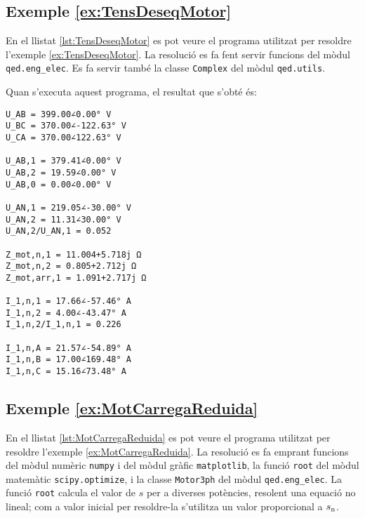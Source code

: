 \hypertarget{exemple:TensDeseqMotor}{\subsection{Exemple \ref*{ex:TensDeseqMotor} \TensDeseqMotor}}
En el llistat \vref{lst:TensDeseqMotor} es pot veure el programa utilitzat per resoldre l'exemple \vref{ex:TensDeseqMotor}. La resolució es fa fent servir funcions del mòdul \texttt{qed.eng\_elec}. Es fa servir també la classe \texttt{Complex} del mòdul \texttt{qed.utils}.


Quan s'executa aquest programa, el resultat que s'obté és:
\lstset{
	language=,
	numbers=none,
	frame=none
}
\begin{lstlisting}
U_AB = 399.00∠0.00° V
U_BC = 370.00∠-122.63° V
U_CA = 370.00∠122.63° V

U_AB,1 = 379.41∠0.00° V
U_AB,2 = 19.59∠0.00° V
U_AB,0 = 0.00∠0.00° V

U_AN,1 = 219.05∠-30.00° V
U_AN,2 = 11.31∠30.00° V
U_AN,2/U_AN,1 = 0.052

Z_mot,n,1 = 11.004+5.718j Ω
Z_mot,n,2 = 0.805+2.712j Ω
Z_mot,arr,1 = 1.091+2.717j Ω

I_1,n,1 = 17.66∠-57.46° A
I_1,n,2 = 4.00∠-43.47° A
I_1,n,2/I_1,n,1 = 0.226

I_1,n,A = 21.57∠-54.89° A
I_1,n,B = 17.00∠169.48° A
I_1,n,C = 15.16∠73.48° A
\end{lstlisting} 


\hypertarget{exemple:MotCarregaReduida}{\subsection{Exemple \ref*{ex:MotCarregaReduida} \MotCarregaReduida}}
En el llistat \vref{lst:MotCarregaReduida} es pot veure el programa utilitzat per resoldre l'exemple \vref{ex:MotCarregaReduida}. La resolució es fa emprant funcions del mòdul numèric \texttt{numpy} i del mòdul gràfic \texttt{matplotlib}, la funció \texttt{root} del mòdul matemàtic \texttt{scipy.optimize}, i la classe \texttt{Motor3ph} del mòdul \texttt{qed.eng\_elec}. La funció \texttt{root} calcula el valor de $s$ per a diverses potències, resolent una equació no lineal; com a valor inicial per resoldre-la  s'utilitza un valor proporcional a $s_\mathrm{n}$.


